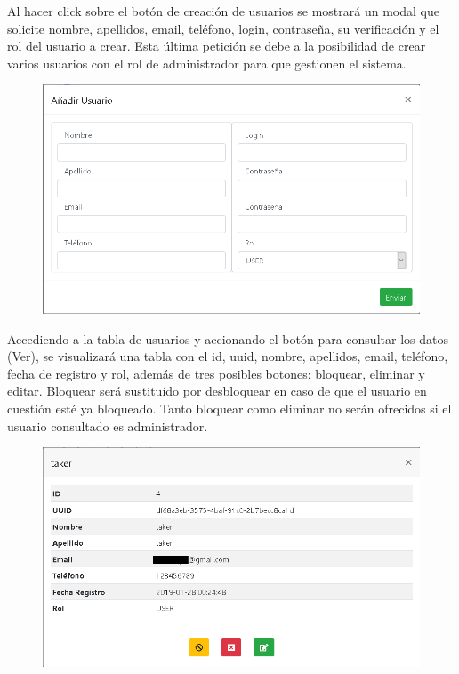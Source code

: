 Al hacer click sobre el bot\'{o}n de creaci\'{o}n de usuarios se mostrar\'{a} un modal que solicite nombre, apellidos, email, tel\'{e}fono, login, contrase\~{n}a, su verificaci\'{o}n y el rol del usuario a crear. Esta \'{u}ltima petici\'{o}n se debe a la posibilidad de crear varios usuarios con el rol de administrador para que gestionen el sistema.


\begin{figure}[h!]
\centering
\includegraphics[width=.8\textwidth]{Img/ManualUsuario/ADMIN_CREATE_USER.png}
\end{figure}

Accediendo a la tabla de usuarios y accionando el bot\'{o}n para consultar los datos (Ver), se visualizar\'{a} una tabla con el id, uuid, nombre, apellidos, email, tel\'{e}fono, fecha de registro y rol, adem\'{a}s de tres posibles botones: bloquear, eliminar y editar. Bloquear ser\'{a} sustitu\'{i}do por desbloquear en caso de que el usuario en cuesti\'{o}n est\'{e} ya bloqueado. Tanto bloquear como eliminar no ser\'{a}n ofrecidos si el usuario consultado es administrador.



\begin{figure}[h!]
\centering
\includegraphics[width=.8\textwidth]{Img/ManualUsuario/ADMIN_READ_USER.png}
\end{figure}

